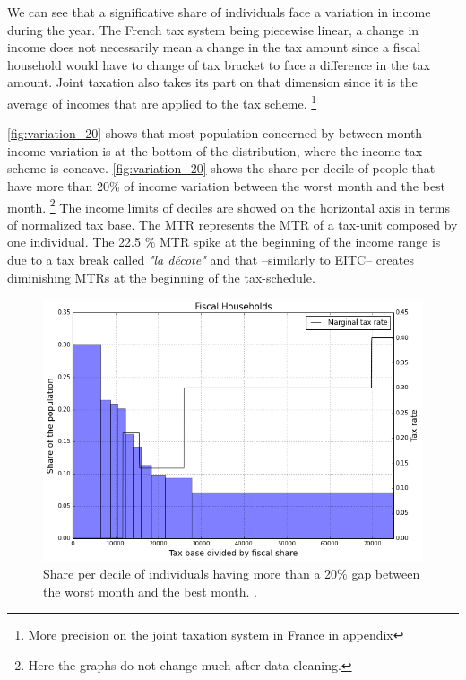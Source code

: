 We can see that a significative share of individuals face a variation in
income during the year. The French tax system being piecewise linear, a change
in income does not necessarily mean a change in the tax amount since a fiscal
household would have to change of tax bracket to face a difference in the tax
amount. Joint taxation also takes its part on that dimension since it is the
average of incomes that are applied to the tax scheme. \footnote{More
precision on the joint taxation system in France in appendix}



\autoref{fig:variation_20} shows that most population concerned by
between-month income variation is at the bottom of the distribution, where the
income tax scheme is concave. \autoref{fig:variation_20} shows the share per
decile of people that have more than 20\% of income variation between the
worst month and the best month. \footnote{Here the graphs do not change much
after data cleaning.} The income limits of deciles are showed on the
horizontal axis in terms of normalized tax base. The MTR represents the MTR of
a tax-unit composed by one individual. The 22.5 \% MTR spike at the beginning
of the income range is due to a tax break called \emph{"la d\'{e}cote"} and
that --similarly to EITC-- creates diminishing MTRs at the beginning of the tax-schedule.

\begin{figure}[ptb]
\caption{Share per decile of individuals having more than a 20\% gap between
the worst month and the best month. .}%
\label{fig:variation_20}
\par
\begin{center}
\includegraphics[width=\textwidth]{share_of_variation_20.png}
\end{center}
\end{figure}

